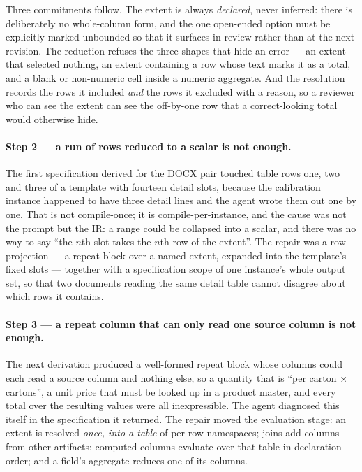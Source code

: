 Three commitments follow. The extent is always \emph{declared}, never inferred: there is
deliberately no whole-column form, and the one open-ended option must be explicitly marked
unbounded so that it surfaces in review rather than at the next revision. The reduction
refuses the three shapes that hide an error --- an extent that selected nothing, an extent
containing a row whose text marks it as a total, and a blank or non-numeric cell inside a
numeric aggregate. And the resolution records the rows it included \emph{and} the rows it
excluded with a reason, so a reviewer who can see the extent can see the off-by-one row that
a correct-looking total would otherwise hide.

\paragraph{Step 2 --- a run of rows reduced to a scalar is not enough.}
The first specification derived for the DOCX pair touched table rows one, two and three of a
template with fourteen detail slots, because the calibration instance happened to have three
detail lines and the agent wrote them out one by one. That is not compile-once; it is
compile-per-instance, and the cause was not the prompt but the IR: a range could be collapsed
into a scalar, and there was no way to say ``the $n$th slot takes the $n$th row of the
extent''. The repair was a row projection --- a repeat block over a named extent, expanded
into the template's fixed slots --- together with a specification scope of one instance's
whole output set, so that two documents reading the same detail table cannot disagree about
which rows it contains.

\paragraph{Step 3 --- a repeat column that can only read one source column is not enough.}
The next derivation produced a well-formed repeat block whose columns could each read a
source column and nothing else, so a quantity that is ``per carton $\times$ cartons'', a unit
price that must be looked up in a product master, and every total over the resulting values
were all inexpressible. The agent diagnosed this itself in the specification it returned.
The repair moved the evaluation stage: an extent is resolved \emph{once, into a table} of
per-row namespaces; joins add columns from other artifacts; computed columns evaluate over
that table in declaration order; and a field's aggregate reduces one of its columns.

